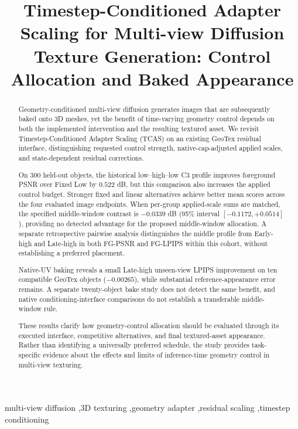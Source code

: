 \documentclass[times,twocolumn,final]{elsarticle}
\begin{document}
\begin{frontmatter}

\title{Timestep-Conditioned Adapter Scaling for Multi-view Diffusion Texture Generation: Control Allocation and Baked Appearance}


\begin{abstract}
Geometry-conditioned multi-view diffusion generates images that are subsequently baked onto 3D meshes, yet the benefit of time-varying geometry control depends on both the implemented intervention and the resulting textured asset. We revisit Timestep-Conditioned Adapter Scaling (TCAS) on an existing GeoTex residual interface, distinguishing requested control strength, native-cap-adjusted applied scales, and state-dependent residual corrections.

On 300 held-out objects, the historical low--high--low C3 profile improves foreground PSNR over Fixed Low by $0.522$ dB, but this comparison also increases the applied control budget. Stronger fixed and linear alternatives achieve better mean scores across the four evaluated image endpoints. When per-group applied-scale sums are matched, the specified middle-window contrast is $-0.0339$ dB (95\% interval $[-0.1172,+0.0514]$), providing no detected advantage for the proposed middle-window allocation. A separate retrospective pairwise analysis distinguishes the middle profile from Early-high and Late-high in both FG-PSNR and FG-LPIPS within this cohort, without establishing a preferred placement.

Native-UV baking reveals a small Late-high unseen-view LPIPS improvement on ten compatible GeoTex objects ($-0.00265$), while substantial reference-appearance error remains. A separate twenty-object bake study does not detect the same benefit, and native conditioning-interface comparisons do not establish a transferable middle-window rule.

These results clarify how geometry-control allocation should be evaluated through its executed interface, competitive alternatives, and final textured-asset appearance. Rather than identifying a universally preferred schedule, the study provides task-specific evidence about the effects and limits of inference-time geometry control in multi-view texturing.
\end{abstract}

\begin{keyword}
\KWD
multi-view diffusion \sep 3D texturing \sep geometry adapter \sep residual scaling \sep timestep conditioning
\end{keyword}

\end{frontmatter}
\end{document}
